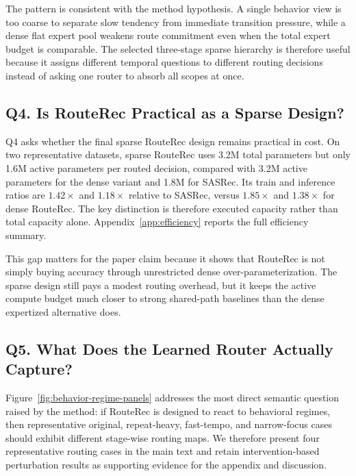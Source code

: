 \documentclass[sigconf,review,anonymous]{acmart}
\begin{document}
The pattern is consistent with the method hypothesis. A single behavior view is too coarse to separate slow tendency from immediate transition pressure, while a dense flat expert pool weakens route commitment even when the total expert budget is comparable. The selected three-stage sparse hierarchy is therefore useful because it assigns different temporal questions to different routing decisions instead of asking one router to absorb all scopes at once.

\subsection{Q4. Is RouteRec Practical as a Sparse Design?}
\label{sec:efficiency}
Q4 asks whether the final sparse RouteRec design remains practical in cost. On two representative datasets, sparse RouteRec uses 3.2M total parameters but only 1.6M active parameters per routed decision, compared with 3.2M active parameters for the dense variant and 1.8M for SASRec. Its train and inference ratios are $1.42\times$ and $1.18\times$ relative to SASRec, versus $1.85\times$ and $1.38\times$ for dense RouteRec. The key distinction is therefore executed capacity rather than total capacity alone. Appendix~\ref{app:efficiency} reports the full efficiency summary.

This gap matters for the paper claim because it shows that RouteRec is not simply buying accuracy through unrestricted dense over-parameterization. The sparse design still pays a modest routing overhead, but it keeps the active compute budget much closer to strong shared-path baselines than the dense expertized alternative does.

\subsection{Q5. What Does the Learned Router Actually Capture?}
\label{sec:behavior-regimes}
Figure~\ref{fig:behavior-regime-panels} addresses the most direct semantic question raised by the method: if RouteRec is designed to react to behavioral regimes, then representative original, repeat-heavy, fast-tempo, and narrow-focus cases should exhibit different stage-wise routing maps. We therefore present four representative routing cases in the main text and retain intervention-based perturbation results as supporting evidence for the appendix and discussion.
\end{document}
